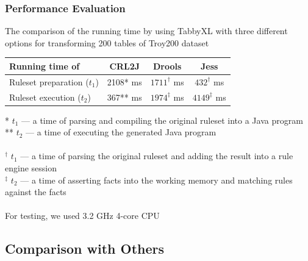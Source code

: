 \documentclass{beamer}
\begin{document}
\begin{frame}
\frametitle{Performance Evaluation}

\small{The comparison of the running time by using TabbyXL with three different options for transforming 200 tables of Troy200 dataset \cite{Nagy2016}}
\begin{table}
		\centering
		    \bgroup
        \def\arraystretch{1.5}
				\begin{tabular}{|l|c|c|c|}
						\hline
									Running time of             & CRL2J   & Drools  & Jess     \\
						\hline
									Ruleset preparation ($t_1$) & 2108* ms & $1711^\dagger$ ms & $432^\dagger$  ms \\
                  Ruleset execution ($t_2$)   & 367** ms & $1974^\ddagger$ ms & $4149^\ddagger$ ms \\
			      \hline
		    \end{tabular}
				\egroup
\end{table}

\scriptsize{
* $t_1$ --- a time of parsing and compiling the original ruleset into a Java program \\
** $t_2$ --- a time of executing the generated Java program
\\~\\
$^\dagger$ $t_1$ --- a time of parsing the original ruleset and adding the result into a rule engine session \\
$^\ddagger$ $t_2$ --- a time of asserting facts into the working memory and matching rules against the facts
\\~\\
For testing, we used 3.2 GHz 4-core CPU
}


\end{frame}

\subsection{Comparison with Others}
\end{document}
